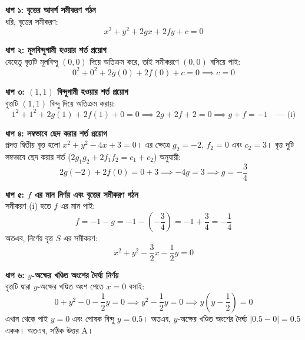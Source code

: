 \documentclass[12pt, a4paper]{article}
\begin{document}
\begin{tcolorbox}[solutionbox={সমাধান (Solution)}]
    \noindent
    \textbf{ধাপ ১: বৃত্তের আদর্শ সমীকরণ গঠন} \\
    ধরি, বৃত্তের সমীকরণ: 
    \[ x^2 + y^2 + 2gx + 2fy + c = 0 \]
    
    \vspace{0.5em}
    \noindent\textbf{ধাপ ২: মূলবিন্দুগামী হওয়ার শর্ত প্রয়োগ} \\
    যেহেতু বৃত্তটি মূলবিন্দু $(0,0)$ দিয়ে অতিক্রম করে, তাই সমীকরণে $(0,0)$ বসিয়ে পাই:
    \[ 0^2 + 0^2 + 2g(0) + 2f(0) + c = 0 \implies c = 0 \]
    
    \vspace{0.5em}
    \noindent\textbf{ধাপ ৩: $(1, 1)$ বিন্দুগামী হওয়ার শর্ত প্রয়োগ} \\
    বৃত্তটি $(1, 1)$ বিন্দু দিয়ে অতিক্রম করায়:
    \[ 1^2 + 1^2 + 2g(1) + 2f(1) + 0 = 0 \implies 2g + 2f + 2 = 0 \implies g + f = -1 \quad \text{--- (i)} \]
    
    \vspace{0.5em}
    \noindent\textbf{ধাপ ৪: লম্বভাবে ছেদ করার শর্ত প্রয়োগ} \\
    প্রদত্ত দ্বিতীয় বৃত্ত হলো $x^2 + y^2 - 4x + 3 = 0$। এর ক্ষেত্রে $g_2 = -2$, $f_2 = 0$ এবং $c_2 = 3$।
    বৃত্ত দুটি লম্বভাবে ছেদ করার শর্ত ($2g_1g_2 + 2f_1f_2 = c_1 + c_2$) অনুযায়ী:
    \[ 2g(-2) + 2f(0) = 0 + 3 \implies -4g = 3 \implies g = -\frac{3}{4} \]
    
    \vspace{0.5em}
    \noindent\textbf{ধাপ ৫: $f$ এর মান নির্ণয় এবং বৃত্তের সমীকরণ গঠন} \\
    সমীকরণ (i) হতে $f$ এর মান পাই:
    \[ f = -1 - g = -1 - \left(-\frac{3}{4}\right) = -1 + \frac{3}{4} = -\frac{1}{4} \]
    অতএব, নির্ণেয় বৃত্ত $S$ এর সমীকরণ:
    \[ x^2 + y^2 -\frac{3}{2}x - \frac{1}{2}y = 0 \]
    
    \vspace{0.5em}
    \noindent\textbf{ধাপ ৬: $y$-অক্ষের খণ্ডিত অংশের দৈর্ঘ্য নির্ণয়} \\
    বৃত্তটি দ্বারা $y$-অক্ষের খণ্ডিত অংশ পেতে $x = 0$ বসাই:
    \[ 0 + y^2 - 0 - \frac{1}{2}y = 0 \implies y^2 - \frac{1}{2}y = 0 \implies y\left(y - \frac{1}{2}\right) = 0 \]
    এখান থেকে পাই $y = 0$ এবং পোষক বিন্দু $y = 0.5$। 
    অতএব, $y$-অক্ষের খণ্ডিত অংশের দৈর্ঘ্য $|0.5 - 0| = 0.5$ একক।
    অতএব, সঠিক উত্তর A।
\end{tcolorbox}
\end{document}
